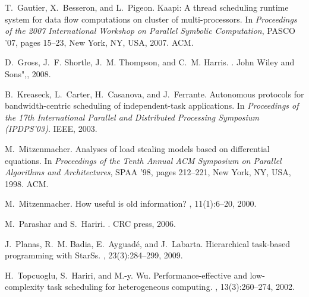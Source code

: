 \documentclass[a4paper,10pt]{article}
\begin{document}
\begin{thebibliography}{10}
T.~Gautier, X.~Besseron, and L.~Pigeon.
\newblock Kaapi: A thread scheduling runtime system for data flow computations
  on cluster of multi-processors.
\newblock In {\em Proceedings of the 2007 International Workshop on Parallel
  Symbolic Computation}, PASCO '07, pages 15--23, New York, NY, USA, 2007. ACM.

D.~Gross, J.~F. Shortle, J.~M. Thompson, and C.~M. Harris.
.
\newblock John Wiley and Sons",, 2008.

B.~Kreaseck, L.~Carter, H.~Casanova, and J.~Ferrante.
\newblock Autonomous protocols for bandwidth-centric scheduling of
  independent-task applications.
\newblock In {\em Proceedings of the 17th International Parallel and
  Distributed Processing Symposium (IPDPS'03)}. IEEE, 2003.

M.~Mitzenmacher.
\newblock Analyses of load stealing models based on differential equations.
\newblock In {\em Proceedings of the Tenth Annual ACM Symposium on Parallel
  Algorithms and Architectures}, SPAA '98, pages 212--221, New York, NY, USA,
  1998. ACM.

M.~Mitzenmacher.
\newblock How useful is old information?
, 11(1):6--20, 2000.

M.~Parashar and S.~Hariri.
.
\newblock CRC press, 2006.

J.~Planas, R.~M. Badia, E.~Ayguad{\'e}, and J.~Labarta.
\newblock Hierarchical task-based programming with {StarSs}.
, 23(3):284--299, 2009.

H.~Topcuoglu, S.~Hariri, and M.-y. Wu.
\newblock Performance-effective and low-complexity task scheduling for
  heterogeneous computing.
,
  13(3):260--274, 2002.

\end{thebibliography}
\end{document}
